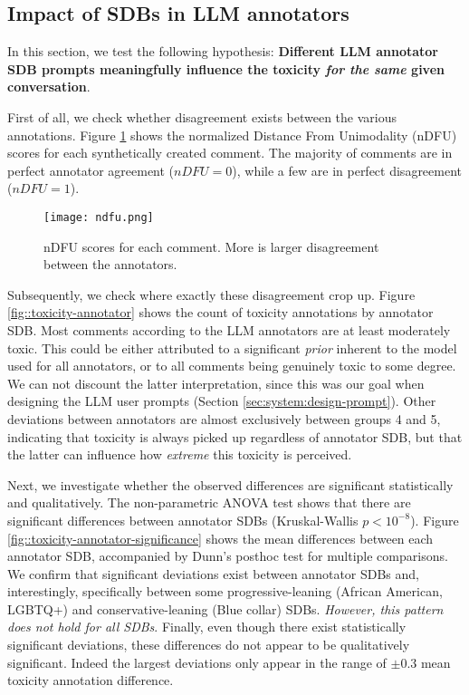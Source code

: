 \subsection{Impact of SDBs in LLM annotators}
\label{ssec:evaluation:annotators}

In this section, we test the following hypothesis: \textbf{Different LLM annotator SDB prompts meaningfully influence the toxicity \textit{for the same} given conversation}. 

First of all, we check whether disagreement exists between the various annotations. Figure \ref{fig::toxicity-ndfu} shows the normalized Distance From Unimodality (nDFU) \cite{pavlopoulos-likas-2024-polarized} scores for each synthetically created comment. The majority of comments are in perfect annotator agreement ($nDFU=0$), while a few are in perfect disagreement ($nDFU=1$).

\begin{figure}
	\centering
	\texttt{[image: ndfu.png]}
	\caption{nDFU \cite{pavlopoulos-likas-2024-polarized} scores for each comment. More is larger disagreement between the annotators.}
	\label{fig::toxicity-ndfu}
\end{figure}

Subsequently, we check where exactly these disagreement crop up. Figure \ref{fig::toxicity-annotator} shows the count of toxicity annotations by annotator SDB. Most comments according to the LLM annotators are at least moderately toxic. This could be either attributed to a significant \textit{prior} inherent to the model used for all annotators, or to all comments being genuinely toxic to some degree. We can not discount the latter interpretation, since this was our goal when designing the LLM user prompts (Section \ref{sec:system:design-prompt}). Other deviations between annotators are almost exclusively between groups 4 and 5, indicating that toxicity is always picked up regardless of annotator SDB, but that the latter can influence how \textit{extreme} this toxicity is perceived.

Next, we investigate whether the observed differences are significant statistically and qualitatively. The non-parametric ANOVA test shows that there are significant differences between annotator SDBs (Kruskal-Wallis $p<10^{-8}$). Figure \ref{fig::toxicity-annotator-significance} shows the mean differences between each annotator SDB, accompanied by Dunn's posthoc test for multiple comparisons. We confirm that significant deviations exist between annotator SDBs and, interestingly, specifically between some progressive-leaning (African American, LGBTQ+) and conservative-leaning (Blue collar) SDBs. \textit{However, this pattern does not hold for all SDBs}. Finally, even though there exist statistically significant deviations, these differences do not appear to be qualitatively significant. Indeed the largest deviations only appear in the range of $\pm 0.3$ mean toxicity annotation difference.

